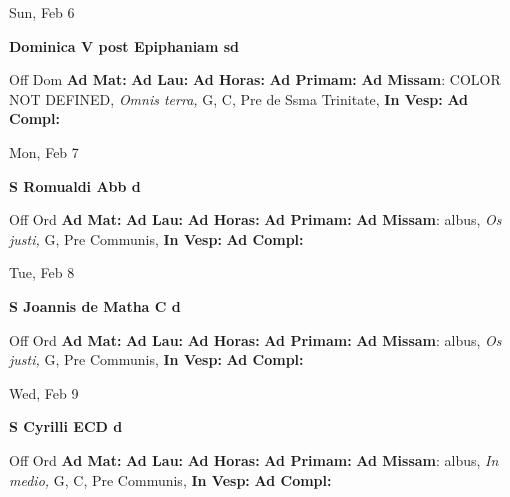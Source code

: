 \documentclass[10pt]{memoir}
\begin{document}
\begin{center}
\begin{minipage}{3.5in}
\vspace{2em}
\begin{center}Sun, Feb 6
\end{center}
\textbf{ \large Dominica V post Epiphaniam
\textnormal{\normalsize sd}}

\begin{justify}Off Dom
\textbf{Ad Mat: }
\textbf{Ad Lau: }
\textbf{Ad Horas: }
\textbf{Ad Primam: }\textbf{Ad Missam}: COLOR NOT DEFINED, \textit{Omnis terra,} G, C, Pre de Ssma Trinitate, 
\textbf{In Vesp: }
\textbf{Ad Compl: }
\end{justify}
\end{minipage}
\end{center}

\begin{center}
\begin{minipage}{3.5in}
\vspace{2em}
\begin{center}Mon, Feb 7
\end{center}
\textbf{ \large S Romualdi Abb
\textnormal{\normalsize d}}

\begin{justify}Off Ord
\textbf{Ad Mat: }
\textbf{Ad Lau: }
\textbf{Ad Horas: }
\textbf{Ad Primam: }\textbf{Ad Missam}: albus, \textit{Os justi,} G, Pre Communis, 
\textbf{In Vesp: }
\textbf{Ad Compl: }
\end{justify}
\end{minipage}
\end{center}

\begin{center}
\begin{minipage}{3.5in}
\vspace{2em}
\begin{center}Tue, Feb 8
\end{center}
\textbf{ \large S Joannis de Matha C
\textnormal{\normalsize d}}

\begin{justify}Off Ord
\textbf{Ad Mat: }
\textbf{Ad Lau: }
\textbf{Ad Horas: }
\textbf{Ad Primam: }\textbf{Ad Missam}: albus, \textit{Os justi,} G, Pre Communis, 
\textbf{In Vesp: }
\textbf{Ad Compl: }
\end{justify}
\end{minipage}
\end{center}

\begin{center}
\begin{minipage}{3.5in}
\vspace{2em}
\begin{center}Wed, Feb 9
\end{center}
\textbf{ \large S Cyrilli ECD
\textnormal{\normalsize d}}

\begin{justify}Off Ord
\textbf{Ad Mat: }
\textbf{Ad Lau: }
\textbf{Ad Horas: }
\textbf{Ad Primam: }\textbf{Ad Missam}: albus, \textit{In medio,} G, C, Pre Communis, 
\textbf{In Vesp: }
\textbf{Ad Compl: }
\end{justify}
\end{minipage}
\end{center}
\end{document}
